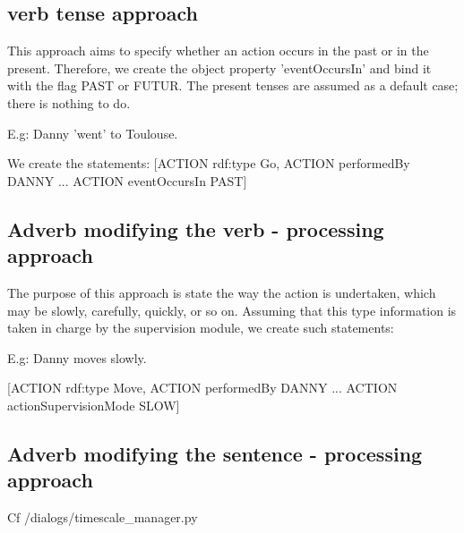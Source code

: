 \documentclass[twoside,a4paper,10pt]{report}
\begin{document}
\subsection{verb tense approach}
\label{08641b0199dbb907cbef92fe4bff9f19}%
This approach aims to specify whether an action occurs in the past or in the present. Therefore, we create the object property 'eventOccursIn' and bind it with the flag PAST or FUTUR. The present tenses are assumed as a default case; there is nothing to do.


\small
\begin{verbatimtab}
  
  E.g: Danny 'went' to Toulouse.
  
  We create the statements:
  [ACTION rdf:type Go,
  ACTION performedBy DANNY
  ...
  ACTION eventOccursIn PAST]
  
  
\end{verbatimtab}
\normalsize

\subsection{Adverb modifying the verb - processing approach}
\label{6b19ff9faa8e1c3a849daa76f49f7353}%

The purpose of this approach is state the way the action is undertaken, which may be slowly, carefully, quickly, or so on.
Assuming that this type information is taken in charge by the supervision module, we create such statements:


\small
\begin{verbatimtab}
  
  E.g: Danny moves slowly.
  
  [ACTION rdf:type Move,
  ACTION performedBy DANNY
  ...
  ACTION actionSupervisionMode SLOW]
  
\end{verbatimtab}
\normalsize

\subsection{Adverb modifying the sentence - processing approach}
\label{c09cf52af4b6af491e8452be15d2b9d4}%

\small
\begin{verbatimtab}
  Cf /dialogs/timescale_manager.py
  
\end{verbatimtab}
\normalsize
\end{document}
